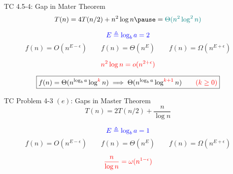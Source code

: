 \begin{frame}{}
  \begin{exampleblock}{TC 4.5-4: Gap in Mater Theorem}
    \[
      {T(n) = 4T(n/2) + n^2 \log n \pause = \teal{\Theta(n^2 \log^{2} n)}}
    \]
  \end{exampleblock}

  \pause
  \[
    \textcolor{blue}{E \triangleq \log_b a = 2}
  \]
  \[
    f(n) = O(n^{E - \epsilon}) \qquad f(n) = \Theta(n^E) \qquad f(n) = \Omega(n^{E + \epsilon})
  \]

  \pause
  \[
    \textcolor{red}{n^2 \log n = o(n^{2 + \epsilon})}
  \]

  \pause
  \[
    \boxed{f(n) = \Theta(n^{\log_b a} \log^{\textcolor{red}{k}}n) \implies \Theta(n^{\log_b a} \log^{\textcolor{red}{k+1}}n) \qquad \textcolor{red}{(k \ge 0)}}
  \]
\end{frame}

\begin{frame}{}
  \begin{exampleblock}{TC Problem 4-3 $(e)$: Gaps in Master Theorem}
    \[
      T(n) = 2T(n/2) + \frac{n}{\log n}
    \]
  \end{exampleblock}

  \pause
  \[
    \textcolor{blue}{E \triangleq \log_b a = 1}
  \]
  \[
    f(n) = O(n^{E - \epsilon}) \qquad f(n) = \Theta(n^E) \qquad f(n) = \Omega(n^{E + \epsilon})
  \]

  \pause
  \[
    \textcolor{red}{\frac{n}{\log n} = \omega(n^{1 - \epsilon})}
  \]
\end{frame}

\begin{frame}{}
\end{frame}

